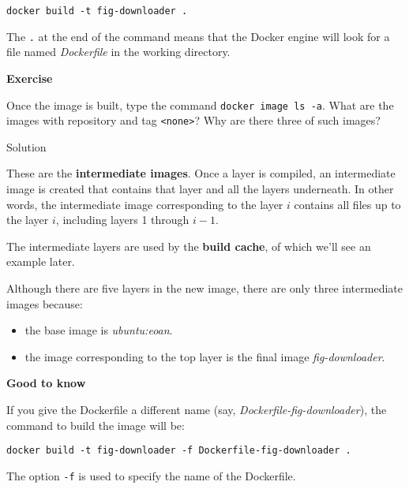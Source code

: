 \documentclass[
]{article}
\providecommand{\tightlist}{%
  \setlength{\itemsep}{0pt}\setlength{\parskip}{0pt}}
\newenvironment{infobox}[1]
  {
  \begin{itemize}
  \renewcommand{\labelitemi}{
    \raisebox{-.7\height}[0pt][0pt]{
      
    }
  }
  \setlength{\fboxsep}{1em}
  \begin{whitebox}
  \item
  }
  {
  \end{whitebox}
  \end{itemize}
  }
\theoremstyle{definition}
\theoremstyle{definition}
\theoremstyle{definition}
\theoremstyle{remark}
\let\BeginKnitrBlock\begin \let\EndKnitrBlock\end
\begin{document}
\begin{verbatim}
docker build -t fig-downloader .
\end{verbatim}

The \texttt{.} at the end of the command means that the Docker engine will
look for a file named \emph{Dockerfile} in the working directory.

\begin{infobox}{exercisebox}

\textbf{Exercise}

\BeginKnitrBlock{exercise}
\protect\hypertarget{exr:unnamed-chunk-16}{}{\label{exr:unnamed-chunk-16} }Once the image is built, type the command \texttt{docker\ image\ ls\ -a}.
What are the images with repository and tag \texttt{\textless{}none\textgreater{}}?
Why are there three of such images?
\EndKnitrBlock{exercise}

\end{infobox}

Solution

\begin{infobox}{exercisebox}

These are the \textbf{intermediate images}.
Once a layer is compiled, an intermediate image is created that
contains that layer and all the layers underneath.
In other words, the intermediate image
corresponding to the layer \(i\) contains all files
up to the layer \(i\), including layers 1 through \(i-1\).

The intermediate layers are used by the \textbf{build cache},
of which we'll see an example later.

Although there are five layers in the new image, there are only
three intermediate images because:

\begin{itemize}
\tightlist
\item
  the base image is \emph{ubuntu:eoan}.
\item
  the image corresponding to the top layer is the final image \emph{fig-downloader}.
\end{itemize}

\end{infobox}

\begin{infobox}{curiosity}

\textbf{Good to know}

If you give the Dockerfile a different name (say, \emph{Dockerfile-fig-downloader}),
the command to build the image will be:

\begin{verbatim}
docker build -t fig-downloader -f Dockerfile-fig-downloader .
\end{verbatim}

The option \texttt{-f} is used to specify the name of the Dockerfile.

\end{infobox}
\end{document}
